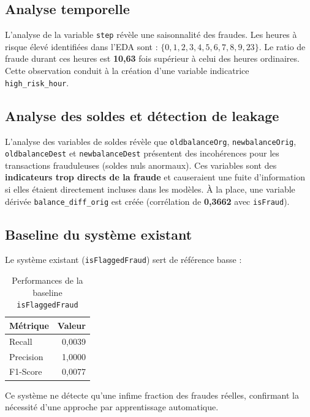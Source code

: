 \documentclass[12pt,a4paper,twoside]{report}
\begin{document}
\subsection{Analyse temporelle}

L'analyse de la variable \texttt{step} révèle une saisonnalité des fraudes. Les heures à risque élevé identifiées dans l'EDA sont : $\{0, 1, 2, 3, 4, 5, 6, 7, 8, 9, 23\}$. Le ratio de fraude durant ces heures est \textbf{10,63} fois supérieur à celui des heures ordinaires. Cette observation conduit à la création d'une variable indicatrice \texttt{high\_risk\_hour}.

\subsection{Analyse des soldes et détection de leakage}

L'analyse des variables de soldes révèle que \texttt{oldbalanceOrg}, \texttt{newbalanceOrig}, \texttt{oldbalanceDest} et \texttt{newbalanceDest} présentent des incohérences pour les transactions frauduleuses (soldes nuls anormaux). Ces variables sont des \textbf{indicateurs trop directs de la fraude} et causeraient une fuite d'information si elles étaient directement incluses dans les modèles. À la place, une variable dérivée \texttt{balance\_diff\_orig} est créée (corrélation de \textbf{0,3662} avec \texttt{isFraud}).

\subsection{Baseline du système existant}

Le système existant (\texttt{isFlaggedFraud}) sert de référence basse :

\begin{table}[H]
\centering
\caption{Performances de la baseline \texttt{isFlaggedFraud}}
\label{tab:baseline_perf}
\begin{tabular}{lr}
\toprule
\textbf{Métrique} & \textbf{Valeur} \\
\midrule
Recall            & 0,0039 \\
Precision         & 1,0000 \\
F1-Score          & 0,0077 \\
\bottomrule
\end{tabular}
\end{table}

Ce système ne détecte qu'une infime fraction des fraudes réelles, confirmant la nécessité d'une approche par apprentissage automatique.
\end{document}
